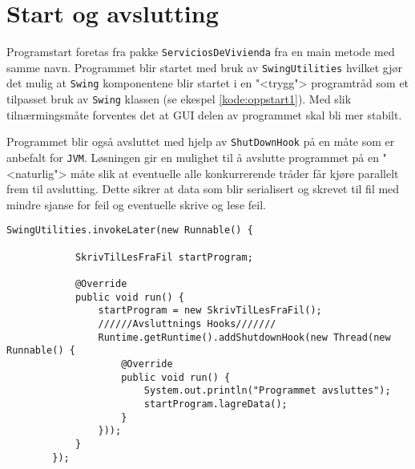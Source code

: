 \section{Start og avslutting}
Programstart foretas fra pakke \texttt{ServiciosDeVivienda} fra en main metode med samme navn. Programmet blir startet med bruk av \texttt{SwingUtilities} hvilket gjør det mulig at \texttt{Swing} komponentene blir startet i en "<trygg"> programtråd som et tilpasset bruk av \texttt{Swing} klassen (se ekespel \ref{kode:oppstart1}). Med slik tilnærmingsmåte forventes det at GUI delen av programmet skal bli mer stabilt. 

Programmet blir også avsluttet med hjelp av \texttt{ShutDownHook} på en måte som er anbefalt for \texttt{JVM}. Løsningen gir en mulighet til å avslutte programmet på en "<naturlig"> måte slik at eventuelle alle konkurrerende tråder får kjøre parallelt frem til avslutting. Dette sikrer at data som blir serialisert og skrevet til fil med mindre sjanse for feil og eventuelle skrive og lese feil.

\begin{lstlisting}[caption=Oppstart av programmet., label=kode:oppstart1]
        SwingUtilities.invokeLater(new Runnable() {

            SkrivTilLesFraFil startProgram;

            @Override
            public void run() {
                startProgram = new SkrivTilLesFraFil();
                //////Avsluttnings Hooks///////
                Runtime.getRuntime().addShutdownHook(new Thread(new Runnable() {
                    @Override
                    public void run() {
                        System.out.println("Programmet avsluttes");
                        startProgram.lagreData();
                    }
                }));
            }
        });
\end{lstlisting}